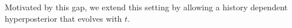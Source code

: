 \documentclass{article}
\theoremstyle{plain}
\theoremstyle{definition}
\theoremstyle{remark}
\begin{document}
Motivated by this gap, we extend this setting 
by allowing a history dependent hyperposterior that evolves with $t$.
\end{document}
